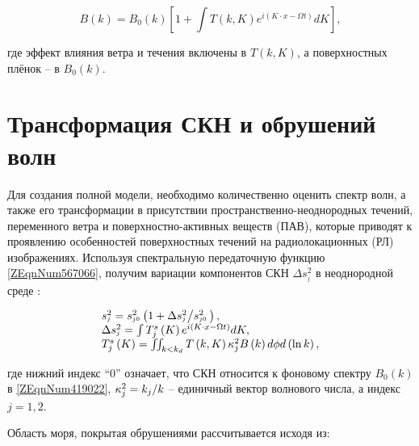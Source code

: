 \begin{equation} \label{1.43)} B\left(k\right)=B_{0} \left(k\right)\left[1+\int T(k,K)e^{i\left(K\cdot x-\Omega t\right)} dK \right],  \end{equation} 



\noindent где эффект влияния ветра и течения включены в $T(k,K)$, а поверхностных плёнок -- в $B_{0} \left(k\right)$.



\section{Трансформация СКН и обрушений волн} \label{AppendixA2}

Для создания полной модели, необходимо количественно оценить спектр волн, а также его трансформации в присутствии пространственно-неоднородных течений, переменного ветра и поверхностно-активных веществ (ПАВ), которые приводят к проявлению особенностей поверхностных течений на радиолокационных (РЛ) изображениях. Используя спектральную передаточную функцию \eqref{ZEqnNum567066}, получим вариации компонентов СКН $\Delta s_{^{j} }^{2} $ в неоднородной среде \citep{Kudryavtsev2005}:



\begin{equation} \label{A.16} \begin{array}{l} {s_{^{j} }^{2} =s_{^{j0} }^{2} \left(1+{\Delta s_{^{j} }^{2} \mathord{\left/ {\vphantom {\Delta s_{^{j} }^{2}  s_{^{j0} }^{2} \, }} \right. \kern-\nulldelimiterspace} s_{^{j0} }^{2} \, } \right),} \\ {\Delta s_{^{j} }^{2} =\int T_{j}^{s} \left(K\right)e^{i\left(K\cdot x-\Omega t\right)}  dK,} \\ {T_{j}^{s} \left(K\right)=\iint \nolimits _{k<k_{d} }T\left(k,K\right)\kappa _{j}^{2} B\left(k\right) d\phi d\left(\ln k\right),} \end{array} \end{equation} 



\noindent где нижний индекс ``0'' означает, что СКН относится к фоновому спектру $B_{0} \left(k\right)$ в \eqref{ZEqnNum419022}, $\kappa _{j}^{2} ={k_{j} \mathord{\left/ {\vphantom {k_{j}  k}} \right. \kern-\nulldelimiterspace} k} $ -- единичный вектор волнового числа, а индекс $j=1,2$.

Область моря, покрытая обрушениями рассчитывается исходя из:



